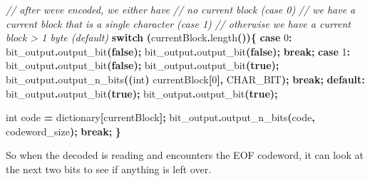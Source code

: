 \documentclass[12pt,twoside]{reedthesis}
\newenvironment{Shaded}{\begin{snugshade}}{\end{snugshade}}
\newcommand{\CommentTok}[1]{\textcolor[rgb]{0.56,0.35,0.01}{\textit{#1}}}
\newcommand{\ControlFlowTok}[1]{\textcolor[rgb]{0.13,0.29,0.53}{\textbf{#1}}}
\newcommand{\DataTypeTok}[1]{\textcolor[rgb]{0.13,0.29,0.53}{#1}}
\newcommand{\DecValTok}[1]{\textcolor[rgb]{0.00,0.00,0.81}{#1}}
\newcommand{\KeywordTok}[1]{\textcolor[rgb]{0.13,0.29,0.53}{\textbf{#1}}}
\newcommand{\NormalTok}[1]{#1}
\newcommand{\OperatorTok}[1]{\textcolor[rgb]{0.81,0.36,0.00}{\textbf{#1}}}
\begin{document}
\begin{Shaded}
\begin{Highlighting}[]
    \CommentTok{// after we\textquotesingle{}ve encoded, we either have }
    \CommentTok{// no current block (case 0)}
    \CommentTok{// we have a current block that is a single character (case 1)}
    \CommentTok{// otherwise we have a current block \textgreater{} 1 byte (default)}
    \ControlFlowTok{switch} \OperatorTok{(}\NormalTok{currentBlock}\OperatorTok{.}\NormalTok{length}\OperatorTok{())\{}
    \ControlFlowTok{case} \DecValTok{0}\OperatorTok{:}
\NormalTok{        bit\_output}\OperatorTok{.}\NormalTok{output\_bit}\OperatorTok{(}\KeywordTok{false}\OperatorTok{);}
\NormalTok{        bit\_output}\OperatorTok{.}\NormalTok{output\_bit}\OperatorTok{(}\KeywordTok{false}\OperatorTok{);}
        \ControlFlowTok{break}\OperatorTok{;}
    \ControlFlowTok{case} \DecValTok{1}\OperatorTok{:}
\NormalTok{        bit\_output}\OperatorTok{.}\NormalTok{output\_bit}\OperatorTok{(}\KeywordTok{false}\OperatorTok{);}
\NormalTok{        bit\_output}\OperatorTok{.}\NormalTok{output\_bit}\OperatorTok{(}\KeywordTok{true}\OperatorTok{);}
\NormalTok{        bit\_output}\OperatorTok{.}\NormalTok{output\_n\_bits}\OperatorTok{((}\DataTypeTok{int}\OperatorTok{)}\NormalTok{ currentBlock}\OperatorTok{[}\DecValTok{0}\OperatorTok{],}\NormalTok{ CHAR\_BIT}\OperatorTok{);}
        \ControlFlowTok{break}\OperatorTok{;}
    \ControlFlowTok{default}\OperatorTok{:}
\NormalTok{        bit\_output}\OperatorTok{.}\NormalTok{output\_bit}\OperatorTok{(}\KeywordTok{true}\OperatorTok{);}
\NormalTok{        bit\_output}\OperatorTok{.}\NormalTok{output\_bit}\OperatorTok{(}\KeywordTok{true}\OperatorTok{);}

        \DataTypeTok{int}\NormalTok{ code }\OperatorTok{=}\NormalTok{ dictionary}\OperatorTok{[}\NormalTok{currentBlock}\OperatorTok{];}
\NormalTok{        bit\_output}\OperatorTok{.}\NormalTok{output\_n\_bits}\OperatorTok{(}\NormalTok{code}\OperatorTok{,}\NormalTok{ codeword\_size}\OperatorTok{);}
        \ControlFlowTok{break}\OperatorTok{;}
    \OperatorTok{\}}
\end{Highlighting}
\end{Shaded}
So when the decoded is reading and encounters the EOF codeword, it can look at the next two bits to see if anything is left over.
\end{document}
